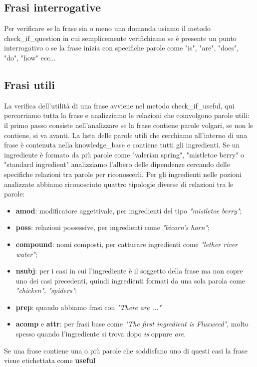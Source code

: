 \subsection{Frasi interrogative}
Per verificare se la frase sia o meno una domanda usiamo il metodo check\_if\_question in cui semplicemente verifichiamo se è presente un punto interrogativo o se la frase inizia con specifiche parole come "is", "are", "does", "do", "how" ecc...
\subsection{Frasi utili}
La verifica dell'utilità di una frase avviene nel metodo check\_if\_useful, qui percorriamo tutta la frase e analizziamo le relazioni che coinvolgono parole utili: il primo passo consiste nell'analizzare se la frase contiene parole volgari, se non le contiene, si va avanti. La lista delle parole utili che cerchiamo all'interno di una frase è contenuta nella knowledge\_base e contiene tutti gli ingredienti. Se un ingrediente è formato da più parole come "valerian spring", "mistletoe berry" o  "standard ingredient" analizziamo l'albero delle dipendenze cercando delle specifiche relazioni tra parole per riconoscerli. Per gli ingredienti nelle pozioni analizzate abbiamo riconosciuto quattro tipologie diverse di relazioni tra le parole:
\begin{itemize}
    \item \textbf{amod}: modificatore aggettivale, per ingredienti del tipo \textit{"mistletoe berry"};
    \item \textbf{poss}: relazioni possessive, per ingredienti come \textit{"bicorn's horn"};
    \item \textbf{compound}: nomi composti, per catturare ingredienti come \textit{"lether river water"};
    \item \textbf{nsubj}: per i casi in cui l'ingrediente è il soggetto della frase ma non copre uno dei casi precedenti, quindi ingredienti formati da una sola parola come \textit{"chicken"}, \textit{"spiders"};
    \item \textbf{prep}: quando abbiamo frasi con \textit{"There are ..."}
    \item \textbf{acomp} e \textbf{attr}: per frasi base come \textit{"The first ingredient is Fluxweed"}, molto spesso quando l'ingrediente si trova dopo \textit{is} oppure \textit{are}.
\end{itemize}
Se una frase contiene una o più parole che soddisfano uno di questi casi la frase viene etichettata come \textbf{useful}

